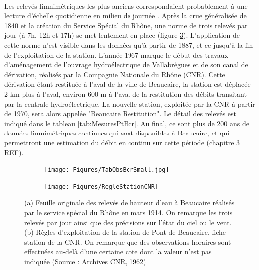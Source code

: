 \documentclass[11pt]{article}
\begin{document}
	\paragraph{} Les relevés limnimétriques les plus anciens correspondaient probablement à une lecture d'échelle quotidienne en milieu de journée \citep{pichard_hauteurs_2013}. Après la crue généralisée de 1840 et la création du Service Spécial du Rhône, une norme de trois relevés par jour (à 7h, 12h et 17h) se met lentement en place (figure \ref{fig:RelevesPt}). L'application de cette norme n'est visible dans les données qu'à partir de 1887, et ce jusqu'à la fin de l'exploitation de la station.  L'année 1967 marque le début des travaux d'aménagement de l'ouvrage hydroélectrique de Vallabrègues et de son canal de dérivation, réalisés par la Compagnie Nationale du Rhône (CNR). Cette dérivation étant restituée à l'aval de la ville de Beaucaire, la station est déplacée 2 km plus à l'aval, environ 600 m à l'aval de la restitution des débits transitant par la centrale hydroélectrique. La nouvelle station, exploitée par la CNR à partir de 1970, sera alors appelée "Beaucaire Restitution". Le détail des relevés est indiqué dans le tableau \ref{tab:MesuresPtBcr}. Au final, ce sont plus de 200 ans de données limnimétriques continues qui sont disponibles à Beaucaire, et qui permettront une estimation du débit en continu sur cette période (chapitre 3 REF). 
	
	\begin{figure}[h]
          \centering
            \begin{subfigure}{0.49\linewidth}
            \centering
            	\texttt{[image: Figures/TabObsBcrSmall.jpg]}\hfill
            	\caption{}
            	\label{subfig:TabObsPt}
            \end{subfigure}
            \begin{subfigure}{0.49\linewidth}
            \centering
            	\texttt{[image: Figures/RegleStationCNR]}
            	\caption{}
           		\label{subfig:RegleCNR}
            \end{subfigure}
      \caption{(a) Feuille originale des relevés de hauteur d'eau à Beaucaire réalisés par le service spécial du Rhône en mars 1914. On remarque les trois relevés par jour ainsi que des précisions sur l'état du ciel ou le vent. (b) Règles d'exploitation de la station de Pont de Beaucaire, fiche station de la CNR. On remarque que des observations horaires sont effectuées au-delà d'une certaine cote dont la valeur n'est pas indiquée (Source : Archives CNR, 1962)}
	 \label{fig:RelevesPt}
	\end{figure}            
            
\end{document}
